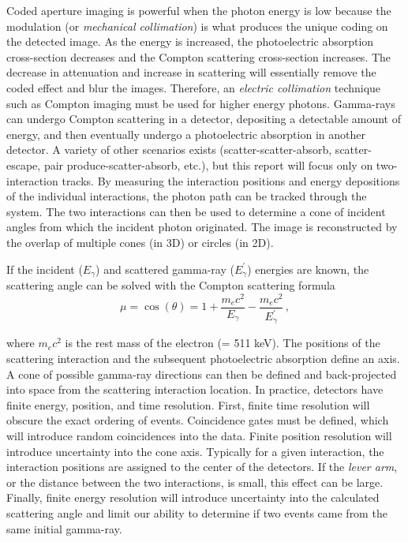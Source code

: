 \documentclass[10pt]{article}
\begin{document}
Coded aperture imaging is powerful when the photon energy is low because the modulation (or \emph{mechanical collimation}) is what produces the unique coding on the detected image. As the energy is increased, the photoelectric absorption cross-section decreases and the Compton scattering cross-section increases. The decrease in attenuation and increase in scattering will essentially remove the coded effect and blur the images. Therefore, an \emph{electric collimation} technique such as Compton imaging must be used for higher energy photons. Gamma-rays can undergo Compton scattering in a detector, depositing a detectable amount of energy, and then eventually undergo a photoelectric absorption in another detector. A variety of other scenarios exists (scatter-scatter-absorb, scatter-escape, pair produce-scatter-absorb, etc.), but this report will focus only on two-interaction tracks. By measuring the interaction positions and energy depositions of the individual interactions, the photon path can be tracked through the system. The two interactions can then be used to determine a cone of incident angles from which the incident photon originated. The image is reconstructed by the overlap of multiple cones (in 3D) or circles (in 2D).

If the incident ($E_\gamma$) and scattered gamma-ray ($E_\gamma^\prime$) energies are known, the scattering angle can be solved with the Compton scattering formula
%
\begin{equation}
\mu = \cos(\theta) = 1 + \frac{m_e c^2}{E_\gamma} - \frac{m_e c^2}{E_\gamma^\prime}\,,
\end{equation}

\noindent where $m_e c^2$ is the rest mass of the electron (= 511 keV). The positions of the scattering interaction and the subsequent photoelectric absorption define an axis. A cone of possible gamma-ray directions can then be defined and back-projected into space from the scattering interaction location. In practice, detectors have finite energy, position, and time resolution. First, finite time resolution will obscure the exact ordering of events. Coincidence gates must be defined, which will introduce random coincidences into the data. Finite position resolution will introduce uncertainty into the cone axis. Typically for a given interaction, the interaction positions are assigned to the center of the detectors. If the \emph{lever arm}, or the distance between the two interactions, is small, this effect can be large. Finally, finite energy resolution will introduce uncertainty into the calculated scattering angle and limit our ability to determine if two events came from the same initial gamma-ray. 
\end{document}
